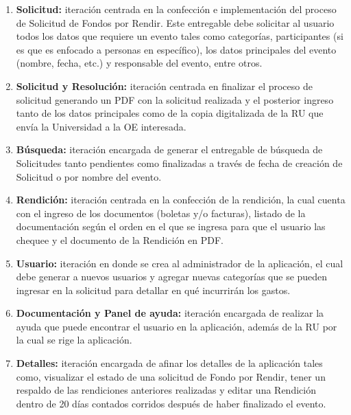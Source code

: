 \begin{enumerate}[label=\textbf{\arabic*}.]
    \item \textbf{Solicitud:} iteración centrada en la confección e implementación del proceso de Solicitud de Fondos por Rendir. Este entregable debe solicitar al usuario todos los datos que requiere un evento tales como categorías, participantes (si es que es enfocado a personas en específico), los datos principales del evento (nombre, fecha, etc.) y responsable del evento, entre otros.
    \item \textbf{Solicitud y Resolución:} iteración centrada en finalizar el proceso de solicitud generando un PDF con la solicitud realizada y el posterior ingreso tanto de los datos principales como de la copia digitalizada de la RU que envía la Universidad a la OE interesada.
    \item \textbf{Búsqueda:} iteración encargada de generar el entregable de búsqueda de Solicitudes tanto pendientes como finalizadas a través de fecha de creación de Solicitud o por nombre del evento.
    \item \textbf{Rendición:} iteración centrada en la confección de la rendición, la cual cuenta con el ingreso de los documentos (boletas y/o facturas), listado de la documentación según el orden en el que se ingresa para que el usuario las chequee y el documento de la Rendición en PDF.
    \item \textbf{Usuario:} iteración en donde se crea al administrador de la aplicación, el cual debe generar a nuevos usuarios y agregar nuevas categorías que se pueden ingresar en la solicitud para detallar en qué incurrirán los gastos.
    \item \textbf{Documentación y Panel de ayuda:} iteración encargada de realizar la ayuda que puede encontrar el usuario en la aplicación, además de la RU por la cual se rige la aplicación.
    \item \textbf{Detalles:} iteración encargada de afinar los detalles de la aplicación tales como, visualizar el estado de una solicitud de Fondo por Rendir, tener un respaldo de las rendiciones anteriores realizadas y editar una Rendición dentro de 20 días contados corridos después de haber finalizado el evento.
\end{enumerate}

